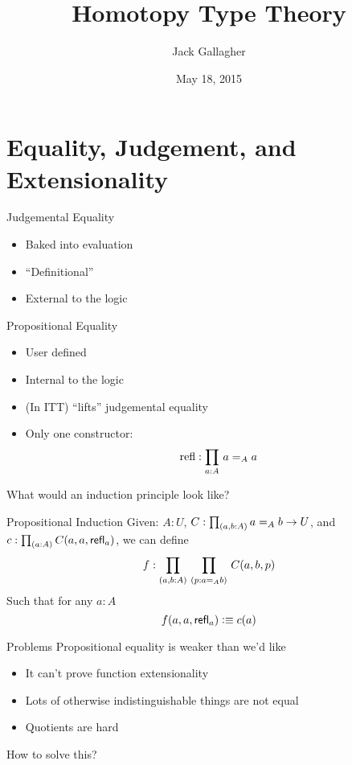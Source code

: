 \documentclass[xcolor=svgnames]{beamer}
\title
  [Homotopy Type Theory\hspace{2em}]
  {Homotopy Type Theory}
\author
  [Jack Gallagher]
  {Jack Gallagher}
\date{May 18, 2015}
\begin{document}
\maketitle

\section{Equality, Judgement, and Extensionality}
\begin{frame}{Judgemental Equality}
  \begin{itemize}
  \item Baked into evaluation
  \item ``Definitional''
  \item External to the logic
  \end{itemize}
\end{frame}

\begin{frame}{Propositional Equality}
  \begin{itemize}
  \item User defined
  \item Internal to the logic
  \item (In ITT) ``lifts'' judgemental equality
  \item Only one constructor: \pause
    $$ \mathrm{refl} : \prd{a:A} a =_A a $$
  \end{itemize} \pause

  What would an induction principle look like?
\end{frame}

\begin{frame}{Propositional Induction}
  Given: $A : U$, $C : \prd{a,b : A} a =_A b \to U$,
  and $c : \prd{a:A} C(a,a,\refl{a})$, we can define
  $$ f : \prd{a,b:A}{p : a =_A b} C(a,b,p) $$
  Such that for any $a:A$
  $$ f(a,a,\mathsf{refl}_{a}) \vcentcolon\equiv c(a) $$
\end{frame}

\begin{frame}{Problems}
  Propositional equality is weaker than we'd like
  \begin{itemize}
  \item It can't prove function extensionality \pause
  \item Lots of otherwise indistinguishable things are not equal \pause
  \item Quotients are hard \pause
  \end{itemize}

  How to solve this?
\end{frame}
\end{document}
